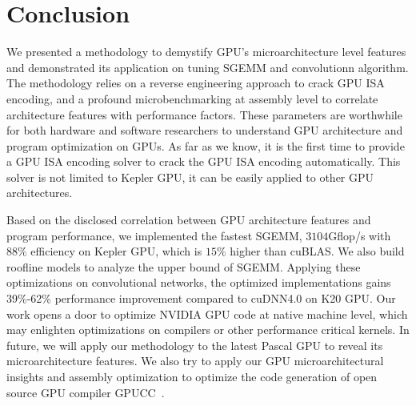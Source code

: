 \section{Conclusion}
\label{sec:conclusion}
We presented a methodology to demystify GPU's microarchitecture level features and demonstrated its 
application on tuning SGEMM and convolutionn algorithm. The methodology relies on a reverse engineering
approach to crack GPU ISA encoding, and a profound microbenchmarking at
assembly level to correlate architecture features with performance factors. 
These parameters are worthwhile for both hardware and software researchers to 
understand GPU architecture and program optimization on GPUs. 
As far as we know, it is the first time to provide a GPU ISA encoding solver to crack the GPU ISA encoding automatically. 
This solver is not limited to Kepler GPU, it can be easily applied to other GPU architectures. 

Based on the disclosed correlation between GPU architecture features and program performance, we implemented the
fastest SGEMM,  $3104$Gflop/s with $88\%$ efficiency on Kepler GPU, which is $15\%$ higher than cuBLAS. 
We also build roofline models to analyze the upper bound of SGEMM. 
Applying these optimizations on convolutional networks, the optimized implementations gains 39\%-62\% performance improvement
compared to cuDNN4.0 on K20 GPU.
Our work opens a door to optimize NVIDIA GPU code at native machine level, which may enlighten optimizations on
compilers or other performance critical kernels.
In future, we will apply our methodology to the latest Pascal GPU to reveal its microarchitecture features.
We also try to apply our GPU microarchitectural insights and assembly
optimization to optimize the code generation of open source GPU compiler
GPUCC~\cite{wu2016gpucc}.
